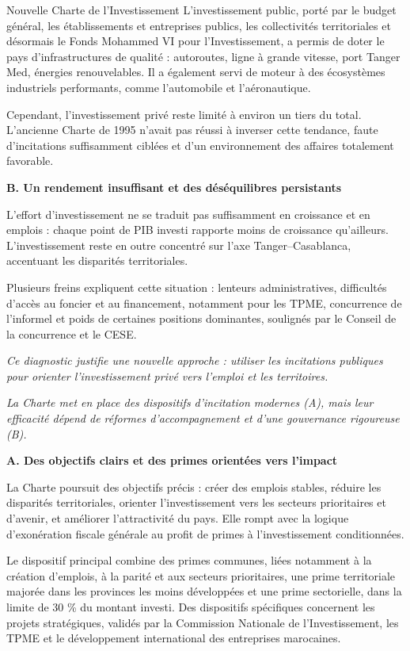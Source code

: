 \begin{copiemodele}{Nouvelle Charte de l'Investissement}
L'investissement public, porté par le budget général, les établissements et entreprises publics, les collectivités territoriales et désormais le Fonds Mohammed VI pour l'Investissement, a permis de doter le pays d'infrastructures de qualité : autoroutes, ligne à grande vitesse, port Tanger Med, énergies renouvelables. Il a également servi de moteur à des écosystèmes industriels performants, comme l'automobile et l'aéronautique.

Cependant, l'investissement privé reste limité à environ un tiers du total. L'ancienne Charte de 1995 n'avait pas réussi à inverser cette tendance, faute d'incitations suffisamment ciblées et d'un environnement des affaires totalement favorable.

\textbf{B. Un rendement insuffisant et des déséquilibres persistants}

L'effort d'investissement ne se traduit pas suffisamment en croissance et en emplois : chaque point de PIB investi rapporte moins de croissance qu'ailleurs. L'investissement reste en outre concentré sur l'axe Tanger–Casablanca, accentuant les disparités territoriales.

Plusieurs freins expliquent cette situation : lenteurs administratives, difficultés d'accès au foncier et au financement, notamment pour les TPME, concurrence de l'informel et poids de certaines positions dominantes, soulignés par le Conseil de la concurrence et le CESE.

\textit{Ce diagnostic justifie une nouvelle approche : utiliser les incitations publiques pour orienter l'investissement privé vers l'emploi et les territoires.}

\textit{La Charte met en place des dispositifs d'incitation modernes (A), mais leur efficacité dépend de réformes d'accompagnement et d'une gouvernance rigoureuse (B).}

\textbf{A. Des objectifs clairs et des primes orientées vers l'impact}

La Charte poursuit des objectifs précis : créer des emplois stables, réduire les disparités territoriales, orienter l'investissement vers les secteurs prioritaires et d'avenir, et améliorer l'attractivité du pays. Elle rompt avec la logique d'exonération fiscale générale au profit de primes à l'investissement conditionnées.

Le dispositif principal combine des primes communes, liées notamment à la création d'emplois, à la parité et aux secteurs prioritaires, une prime territoriale majorée dans les provinces les moins développées et une prime sectorielle, dans la limite de 30 \% du montant investi. Des dispositifs spécifiques concernent les projets stratégiques, validés par la Commission Nationale de l'Investissement, les TPME et le développement international des entreprises marocaines.


\end{copiemodele}
